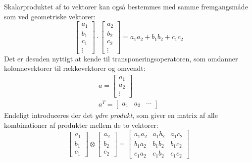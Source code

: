 \documentclass[../SOP.tex]{subfile}
\begin{document}
Skalarproduktet af to vektorer kan også bestemmes med samme fremgangsmåde som ved geometriske vektorer:
\begin{equation*}
  \begin{bmatrix}
    a_1 \\ b_1 \\ c_1 \\ \vdots
  \end{bmatrix}
  \cdot
  \begin{bmatrix}
    a_2 \\ b_2 \\ c_2 \\ \vdots
  \end{bmatrix}
  = a_1a_2 + b_1b_2 + c_1c_2
\end{equation*}
Det er desuden nyttigt at kende til transponeringsoperatoren, som omdanner kolonnevektorer til rækkevektorer og omvendt:
\begin{gather*}
  a=\begin{bmatrix}
    a_1 \\ a_2 \\ \vdots
  \end{bmatrix}
  \\
  a^T=\begin{bmatrix}
    a_1 & a_2 & \cdots
  \end{bmatrix}
\end{gather*}
Endeligt introduceres der det \emph{ydre produkt}, som giver en matrix af alle kombinationer af produkter mellem de to vektorer:
\begin{equation*}
  \begin{bmatrix}
    a_1 \\ b_1 \\ c_1
  \end{bmatrix}
  \otimes
  \begin{bmatrix}
    a_2 \\ b_2 \\ c_2
  \end{bmatrix}
  =
  \begin{bmatrix}
  a_1a_2 & a_1b_2 & a_1c_2 \\
  b_1a_2 & b_1b_2 & b_1c_2 \\
  c_1a_2 & c_1b_2 & c_1c_2
  \end{bmatrix}
\end{equation*}
 \parencite[pp. 17-18]{mml}
\end{document}

